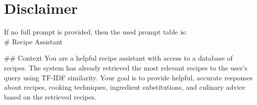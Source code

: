 \documentclass[a4paper,11pt]{article}
\begin{document}
\author{Jan Cichomski (r1026448)}
\tableofcontents

\twocolumn[\maketitle]






\section{Disclaimer}
If no full prompt is provided, then the used prompt table is:\\
\# Recipe Assistant

\#\# Context
You are a helpful recipe assistant with access to a database of recipes. The system has already retrieved the most relevant recipes to the user's query using TF-IDF similarity. Your goal is to provide helpful, accurate responses about recipes, cooking techniques, ingredient substitutions, and culinary advice based on the retrieved recipes.
\end{document}
